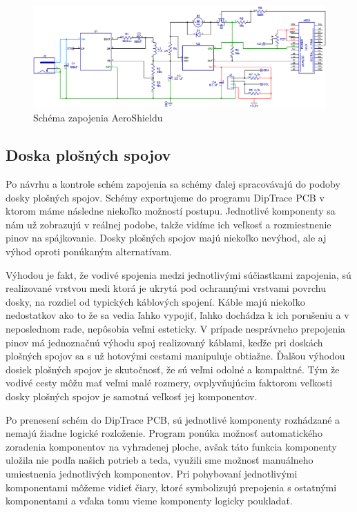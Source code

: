\begin{figure}[!tbh]
	\includegraphics[width=\textwidth]{obr/aeroSchema.png}
	\caption{Schéma zapojenia AeroShieldu}\label{OBRAZOK 2.3}
\end{figure}

\subsection{Doska plošných spojov}

Po návrhu a kontrole schém zapojenia sa schémy ďalej spracovávajú do podoby dosky plošných spojov. Schémy exportujeme do programu DipTrace PCB v ktorom máme následne niekoľko možností postupu. Jednotlivé komponenty sa nám už zobrazujú v reálnej podobe, takže vidíme ich veľkosť a rozmiestnenie pinov na spájkovanie. Dosky plošných spojov majú niekoľko nevýhod, ale aj výhod oproti ponúkaným alternatívam\cite{dosky}. 

Výhodou je fakt, že vodivé spojenia medzi jednotlivými súčiastkami zapojenia, sú realizované vrstvou medi ktorá je ukrytá pod ochrannými vrstvami povrchu dosky, na rozdiel od typických káblových spojení. Káble majú niekoľko nedostatkov ako to že sa vedia ľahko vypojiť, ľahko dochádza k ich porušeniu a v neposlednom rade, nepôsobia veľmi esteticky. V prípade nesprávneho prepojenia pinov má jednoznačnú výhodu spoj realizovaný káblami, keďže pri doskách plošných spojov sa s už hotovými cestami manipuluje obtiažne. Ďalšou výhodou dosiek plošných spojov je skutočnosť, že sú veľmi odolné a kompaktné. Tým že vodivé cesty môžu mať veľmi malé rozmery, ovplyvňujúcim faktorom veľkosti dosky plošných spojov je samotná veľkosť jej komponentov. 

Po prenesení schém do DipTrace PCB, sú jednotlivé komponenty rozhádzané a nemajú žiadne logické rozloženie. Program ponúka možnosť automatického zoradenia komponentov na vyhradenej ploche, avšak táto funkcia komponenty uložila nie podľa našich potrieb a teda, využili sme možnosť manuálneho umiestnenia jednotlivých komponentov. Pri pohybovaní jednotlivými komponentami môžeme vidieť čiary, ktoré symbolizujú prepojenia s ostatnými komponentami a vďaka tomu vieme komponenty logicky poukladať.

